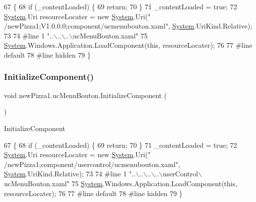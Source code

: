 \begin{DoxyCode}
67                                           \{
68             \textcolor{keywordflow}{if} (\_contentLoaded) \{
69                 \textcolor{keywordflow}{return};
70             \}
71             \_contentLoaded = \textcolor{keyword}{true};
72             \hyperlink{namespaceSystem}{System}.Uri resourceLocater = \textcolor{keyword}{new} \hyperlink{namespaceSystem}{System}.Uri(\textcolor{stringliteral}{"
      /newPizza1;V1.0.0.0;component/ucmenubouton.xaml"}, \hyperlink{namespaceSystem}{System}.UriKind.Relative);
73             
74 \textcolor{preprocessor}{            #line 1 "..\(\backslash\)..\(\backslash\)..\(\backslash\)ucMenuBouton.xaml"}
75             \hyperlink{namespaceSystem}{System}.Windows.Application.LoadComponent(\textcolor{keyword}{this}, resourceLocater);
76             
77 \textcolor{preprocessor}{            #line default}
78 \textcolor{preprocessor}{            #line hidden}
79         \}
\end{DoxyCode}
\mbox{\label{classnewPizza1_1_1ucMenuBouton_a080790946e454afc7d1441447a1e2313}} 
\subsubsection{\texorpdfstring{Initialize\+Component()}{InitializeComponent()}\hspace{0.1cm}{\footnotesize\ttfamily [6/6]}}
{\footnotesize\ttfamily void new\+Pizza1.\+uc\+Menu\+Bouton.\+Initialize\+Component (\begin{DoxyParamCaption}{ }\end{DoxyParamCaption})\hspace{0.3cm}{\ttfamily [inline]}}



Initialize\+Component 


\begin{DoxyCode}
67                                           \{
68             \textcolor{keywordflow}{if} (\_contentLoaded) \{
69                 \textcolor{keywordflow}{return};
70             \}
71             \_contentLoaded = \textcolor{keyword}{true};
72             \hyperlink{namespaceSystem}{System}.Uri resourceLocater = \textcolor{keyword}{new} \hyperlink{namespaceSystem}{System}.Uri(\textcolor{stringliteral}{"
      /newPizza1;component/usercontrol/ucmenubouton.xaml"}, \hyperlink{namespaceSystem}{System}.UriKind.Relative);
73             
74 \textcolor{preprocessor}{            #line 1 "..\(\backslash\)..\(\backslash\)..\(\backslash\)..\(\backslash\)userControl\(\backslash\)ucMenuBouton.xaml"
}
75             \hyperlink{namespaceSystem}{System}.Windows.Application.LoadComponent(\textcolor{keyword}{this}, resourceLocater);
76             
77 \textcolor{preprocessor}{            #line default
}
78 \textcolor{preprocessor}{            #line hidden
}
79         \}
\end{DoxyCode}


